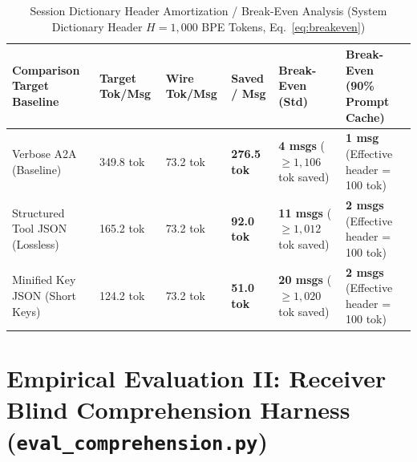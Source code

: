 \documentclass[9pt,a4paper]{extarticle}
\begin{document}
\begin{table}[h!]
\centering
\caption{Session Dictionary Header Amortization / Break-Even Analysis (System Dictionary Header $H = 1{,}000$ BPE Tokens, Eq.\ \ref{eq:breakeven})}
\label{tab:breakeven}
\footnotesize
\renewcommand{\arraystretch}{1.08}
\begin{tabularx}{\textwidth}{L{3.7cm} R{1.9cm} R{1.9cm} R{1.9cm} R{2.4cm} Y}
\toprule
{}
\textbf{\color{white}Comparison Target Baseline} &
\textbf{\color{white}Target Tok/Msg} &
\textbf{\color{white}Wire Tok/Msg} &
\textbf{\color{white}Saved / Msg} &
\textbf{\color{white}Break-Even (Std)} &
\textbf{\color{white}Break-Even (90\% Prompt Cache)} \\
\midrule
Verbose A2A (Baseline) & 349.8 tok & 73.2 tok & \textbf{276.5 tok} & \textbf{4 msgs} ($\ge 1{,}106$ tok saved) & \textbf{1 msg} (Effective header = 100 tok) \\
Structured Tool JSON (Lossless) & 165.2 tok & 73.2 tok & \textbf{92.0 tok} & \textbf{11 msgs} ($\ge 1{,}012$ tok saved) & \textbf{2 msgs} (Effective header = 100 tok) \\
Minified Key JSON (Short Keys) & 124.2 tok & 73.2 tok & \textbf{51.0 tok} & \textbf{20 msgs} ($\ge 1{,}020$ tok saved) & \textbf{2 msgs} (Effective header = 100 tok) \\
\bottomrule
\end{tabularx}
\end{table}

\section{Empirical Evaluation II: Receiver Blind Comprehension Harness (\texttt{eval\_comprehension.py})}
\end{document}
